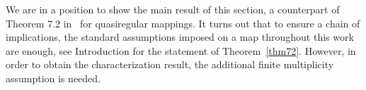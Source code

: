 \documentclass[11pt,a4paper,reqno]{amsart}
\newtheorem{theorem}{Theorem}[section]
\theoremstyle{definition}
\newcommand{\ep}{\epsilon}
\newcommand{\B}{\mathbb{B}^n}
\newcommand{\Nm}{\mathcal{N}}
\newcommand{\Rn}{{\mathbb R}^n}
\newcommand{\ud}{\mathrm {d}}
\newcommand{\Sn}{\mathbb{S}^{n-1}}
\newcommand{\blue}{\color{blau}}
\newcounter{komcounter}
\numberwithin{komcounter}{section}
\newcommand{\komT}[1]{{\bf \blue [\refstepcounter{komcounter}\thekomcounter (by T): #1]}}
\begin{document}
We are in a position to show the main result of this section, a counterpart of Theorem 7.2 in~\cite{ak} for quasiregular mappings. It turns out that to ensure a chain of implications, the standard assumptions imposed on a map throughout this work are enough, see Introduction for the statement of Theorem~\ref{thm72}. However, in order to obtain the characterization result, the additional finite multiplicity assumption is needed. 
\end{document}
